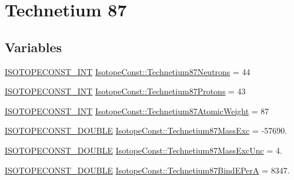 \hypertarget{group___isotope_const-_technetium-_tc87}{}\section{Technetium 87}
\label{group___isotope_const-_technetium-_tc87}
\subsection*{Variables}
\begin{DoxyCompactItemize}
\item 
\mbox{\hyperlink{group___isotope_const-_macros_ga5f18360b3e99483a35c32d789e62621c}{I\+S\+O\+T\+O\+P\+E\+C\+O\+N\+S\+T\+\_\+\+I\+NT}} \mbox{\hyperlink{group___isotope_const-_technetium-_tc87_ga1131d1cbf5a165b6c5bbb20fe1379cb3}{Isotope\+Const\+::\+Technetium87\+Neutrons}} = 44
\item 
\mbox{\hyperlink{group___isotope_const-_macros_ga5f18360b3e99483a35c32d789e62621c}{I\+S\+O\+T\+O\+P\+E\+C\+O\+N\+S\+T\+\_\+\+I\+NT}} \mbox{\hyperlink{group___isotope_const-_technetium-_tc87_gab8885551d13b9a6c1e7a3de678c1c2ec}{Isotope\+Const\+::\+Technetium87\+Protons}} = 43
\item 
\mbox{\hyperlink{group___isotope_const-_macros_ga5f18360b3e99483a35c32d789e62621c}{I\+S\+O\+T\+O\+P\+E\+C\+O\+N\+S\+T\+\_\+\+I\+NT}} \mbox{\hyperlink{group___isotope_const-_technetium-_tc87_ga63e9ff96e3c06e0cabb92a6e81101d38}{Isotope\+Const\+::\+Technetium87\+Atomic\+Weight}} = 87
\item 
\mbox{\hyperlink{group___isotope_const-_macros_ga8f45a7272ce02c0b4c65c44636ed719a}{I\+S\+O\+T\+O\+P\+E\+C\+O\+N\+S\+T\+\_\+\+D\+O\+U\+B\+LE}} \mbox{\hyperlink{group___isotope_const-_technetium-_tc87_gaeb626d9c87423bec18f554e8b364d2cb}{Isotope\+Const\+::\+Technetium87\+Mass\+Exc}} = -\/57690.
\item 
\mbox{\hyperlink{group___isotope_const-_macros_ga8f45a7272ce02c0b4c65c44636ed719a}{I\+S\+O\+T\+O\+P\+E\+C\+O\+N\+S\+T\+\_\+\+D\+O\+U\+B\+LE}} \mbox{\hyperlink{group___isotope_const-_technetium-_tc87_gae9d539c7f737af29f31777b686c8f0bd}{Isotope\+Const\+::\+Technetium87\+Mass\+Exc\+Unc}} = 4.
\item 
\mbox{\hyperlink{group___isotope_const-_macros_ga8f45a7272ce02c0b4c65c44636ed719a}{I\+S\+O\+T\+O\+P\+E\+C\+O\+N\+S\+T\+\_\+\+D\+O\+U\+B\+LE}} \mbox{\hyperlink{group___isotope_const-_technetium-_tc87_ga7fa102874375a4d772e539ec4d761bb5}{Isotope\+Const\+::\+Technetium87\+Bind\+E\+PerA}} = 8347.
\item 

\end{DoxyCompactItemize}
